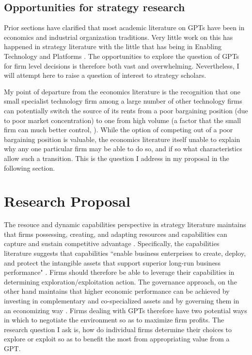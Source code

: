 \documentclass[12pt,letterpaper]{article}
\begin{document}
\subsection{Opportunities for strategy research}
Prior sections have clarified that most academic literature on GPTs have been in economics and industrial organization traditions. Very little work on this has happened in strategy literature with the little that has being in Enabling Technology and Platforms \cite{Teece2012a}. The opportunities to explore the question of GPTs for firm level decisions is therefore both vast and overwhelming. Nevertheless, I will attempt here to raise a question of interest to strategy scholars.

My point of departure from the economics literature is the recognition that one small  specialist technology firm among a large number of other technology firms can potentially switch the source of its rents from a poor bargaining position (due to poor market concentration) to one from high volume (a factor that the small firm can much better control, \cite{Gambardella2010}). While the option of competing out of a poor bargaining position is valuable, the economics literature itself unable to explain why any one particular firm may be able to do so, and if so what characteristics allow such a transition. This is the question I address in my proposal in the following section.


\section{Research Proposal}
The resouce and dynamic capabilities perspective in strategy literature maintains that firms possessing, creating, and adapting resources and capabilities can capture and sustain competitive advantage \citep{Barney1991, Penrose1959, Teece1997}. Specifically, the capabilities literature suggests that capabilities ``enable business
enterprises to create, deploy, and protect the intangible assets that support superior long-run business performance" \citep{Teece2007}. Firms should therefore be able to leverage their capabilities in determining exploration/exploitation action. The governance approach, on the other hand maintains that higher economic performance can be achieved by investing in complementary and co-specialized assets \citep{Helfat1997, Teece1986} and by governing them in an economizing way \citep{Oxley1997, Williamson1985}. Firms dealing with GPTs therefore have two potential ways in which to negotiate the environment so as to maximize firm profits.  The research question I ask is, how do individual firms determine their choices to explore or exploit so as to benefit the most from appropriating value from a GPT.
\end{document}
